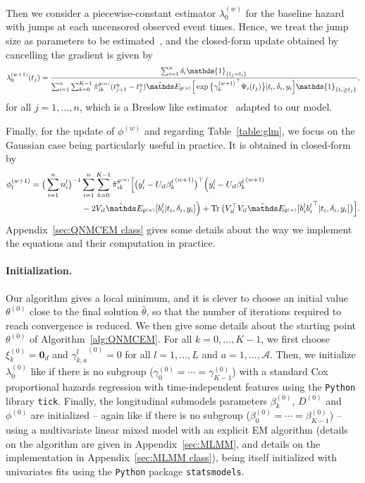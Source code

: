 \documentclass[11pt]{article}
\DeclareMathOperator{\Tr}{Tr}
\newcommand{\ind}[1]{\mathds{1}_{#1}}
\newcommand{\cA}{\mathcal A}
\newcommand{\E}{\mathds E}
\begin{document}
Then we consider a piecewise-constant estimator $\lambda_0^{(w)}$ for the baseline hazard with jumps at each uncensored observed event times. Hence, we treat the jump size as parameters to be estimated~\citep{klein1992semiparametric}, and the closed-form update obtained by cancelling the gradient is given by
\begin{equation}
  \label{eq:update_lambda_0}
  \lambda_0^{(w+1)}(t_j)= \dfrac{\sum_{i=1}^n \delta_i \ind{\{t_j=t_i\}}}{\sum_{i=1}^n \sum_{k=0}^{K-1} \hat \pi_{ik}^{\theta^{(w)}} (t_{j+1}^u-t_j^u) \hat \E_{\theta^{(w)}}\Big[\exp \big\{{\gamma_k^{(w+1)}}^\top \Psi_i(t_j)\big\} | t_i, \delta_i, y_i \Big] \ind{\{t_i \geq t_j\}} },
\end{equation}
for all $j=1, \ldots, n$, which is a Breslow like estimator~\citep{breslow1972contribution} adapted to our model. 

Finally, for the update of $\phi^{(w)}$ and regarding Table~\ref{table:glm}, we focus on the Gaussian case being particularly useful in practice. It is obtained in closed-form by
\begin{align}
  \label{eq:update_phi}
  \phi_l^{(w+1)} = \big(\sum_{i=1}^n n_i^l \big)^{-1} &\sum_{i=1}^n \sum_{k=0}^{K-1} \hat \pi_{ik}^{\theta^{(w)}} \Big[ \big(y_i^l - U_{il} {\beta_k^l}^{(w+1)}\big)^\top \Big(y_i^l - U_{il} {\beta_k^l}^{(w+1)} \nonumber \\
  & - 2V_{il} \hat \E_{\theta^{(w)}}[ b_i^l | t_i, \delta_i, y_i]\Big) + \Tr\big(V_{il}^\top V_{il}\hat \E_{\theta^{(w)}}[ b_i^l {b_i^l}^\top | t_i, \delta_i, y_i]\big) \Big].
\end{align}
Appendix~\ref{sec:QNMCEM class} gives some details about the way we implement the equations and their computation in practice.

\paragraph*{Initialization.}
Our algorithm gives a local minimum, and it is clever to choose an initial value $\theta^{(0)}$ close to the final solution $\hat \theta$, so that the number of iterations required to reach convergence is reduced. We then give some details about the starting point $\theta^{(0)}$ of Algorithm~\ref{alg:QNMCEM}. 
For all $k = 0, \ldots, K-1$, we first choose $\xi_k^{(0)} = \mathbf{0}_d$ and ${\gamma_{k,a}^l}^{(0)} = 0$ for all $l=1, \ldots, L$ and $a=1, \ldots, \cA$. Then, we initialize $\lambda_0^{(0)}$ like if there is no subgroup ($\gamma_{0}^{(0)} = \cdots = \gamma_{K-1}^{(0)}$) with a standard Cox proportional hazards regression with time-independent features using the \texttt{Python} library \texttt{tick}. Finally, the longitudinal submodels parameters $\beta_k^{(0)}$, $D^{(0)}$ and $\phi^{(0)}$ are initialized -- again like if there is no subgroup ($\beta_0^{(0)} = \cdots = \beta_{K-1}^{(0)}$) -- using a multivariate linear mixed model with an explicit EM algorithm (details on the algorithm are given in Appendix~\ref{sec:MLMM}, and details on the implementation in Appendix~\ref{sec:MLMM class}), being itself initialized with univariates fits using the \texttt{Python} package \texttt{statsmodels}.
\end{document}
